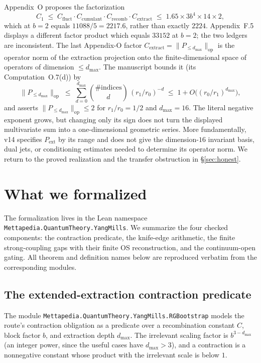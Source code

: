 \documentclass[11pt]{article}
\theoremstyle{definition}
\newcommand{\dmax}{d_{\max}}
\newcommand{\Pleq}{P_{\leq \dmax}}
\begin{document}
Appendix~O proposes the factorization
\[
  C_1 \;\leq\; C_{\mathrm{fluct}} \cdot C_{\mathrm{cumulant}} \cdot C_{\mathrm{recomb}} \cdot C_{\mathrm{extract}}
  \;\leq\; 1.65 \times 3b^4 \times 14 \times 2,
\]
which at $b=2$ equals $11088/5=2217.6$, rather than exactly $2224$.
Appendix~F.5 displays a different factor product which equals $33152$ at
$b=2$; the two ledgers are inconsistent. The last Appendix-O factor
$C_{\mathrm{extract}} = \|\Pleq\|_{\mathrm{op}}$ is the operator norm of the
extraction projection onto the finite-dimensional space of operators of
dimension $\leq \dmax$. The manuscript bounds it (its Computation~O.7(d)) by
\[
  \|\Pleq\|_{\mathrm{op}} \;\leq\; \sum_{d=0}^{\dmax} \binom{\#\mathrm{indices}}{d}\,(r_1/r_0)^{-d}
  \;\leq\; 1 + O\!\big((r_0/r_1)^{\dmax}\big),
\]
and asserts $\|\Pleq\|_{\mathrm{op}} \leq 2$ for $r_1/r_0 = 1/2$ and $\dmax=16$.
The literal negative exponent grows, but changing only its sign does not turn
the displayed multivariate sum into a one-dimensional geometric series. More
fundamentally, v14 specifies $P_{\mathrm{ext}}$ by its range and does not give
the dimension-$16$ invariant basis, dual jets, or conditioning estimates needed
to determine its operator norm. We return to the proved realization and the
transfer obstruction in \S\ref{sec:honest}.

\section{What we formalized}

The formalization lives in the Lean namespace
\texttt{Mettapedia.QuantumTheory.YangMills}. We summarize the four checked
components: the contraction predicate, the knife-edge arithmetic, the finite
strong-coupling gaps with their finite OS reconstruction, and the
continuum-open gating. All theorem and definition names below are reproduced
verbatim from the corresponding modules.

\subsection{The extended-extraction contraction predicate}

The module \texttt{Mettapedia.QuantumTheory.YangMills.RGBootstrap} models the
route's contraction obligation as a predicate over a recombination constant
$C$, block factor $b$, and extraction depth $\dmax$. The irrelevant scaling
factor is $b^{3-\dmax}$ (an integer power, since the useful cases have
$\dmax>3$), and a contraction is a nonnegative constant whose product with the
irrelevant scale is below $1$.
\end{document}
